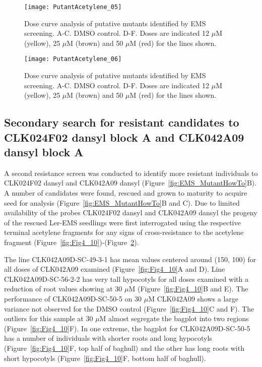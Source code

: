 \begin{figure}
\centering
\texttt{[image: PutantAcetylene\_05]}
\caption{Dose curve analysis of putative mutants identified by EMS screening. A-C. DMSO control. D-F. Doses are indicated 12 $\mu$M (yellow), 25 $\mu$M (brown) and 50 $\mu$M (red) for the lines shown.} 
\label{fig:Fig4_14}
\end{figure}

\begin{figure}
\centering
\texttt{[image: PutantAcetylene\_06]}
\caption{Dose curve analysis of putative mutants identified by EMS screening. A-C. DMSO control. D-F. Doses are indicated 12 $\mu$M (yellow), 25 $\mu$M (brown) and 50 $\mu$M (red) for the lines shown.} 
\label{fig:Fig4_15}
\end{figure}

\clearpage

\subsection{Secondary search for resistant candidates to CLK024F02 dansyl block A and CLK042A09 dansyl block A}


A second resistance screen was conducted to identify more resistant individuals to CLK024F02 dansyl and CLK042A09 dansyl (Figure~\ref{fig:EMS_MutantHowTo}B). A number of candidates were found, rescued and grown to maturity to acquire seed for analysis (Figure~\ref{fig:EMS_MutantHowTo}B and C). Due to limited availability of the probes CLK024F02 dansyl and CLK042A09 dansyl the progeny of the rescued Ler-EMS seedlings were first interrogated using the respective terminal acetylene fragments for any signs of cross-resistance to the acetylene fragment (Figure~\ref{fig:Fig4_10})-(Figure~\ref{fig:Fig4_15}). 

The line CLK042A09D-SC-49-3-1 has mean values centered around (150, 100) for all doses of CLK042A09 examined (Figure~\ref{fig:Fig4_10}A and D). Line CLK042A09D-SC-56-2-2 has very tall hypocotyls for all doses examined with a reduction of root values showing at 30 $\mu$M (Figure~\ref{fig:Fig4_10}B and E). The performance of CLK042A09D-SC-50-5 on 30 $\mu$M CLK042A09 shows a large variance not observed for the DMSO control (Figure~\ref{fig:Fig4_10}C and F). The outliers for this sample at 30 $\mu$M almost segregate the bagplot into two regions (Figure~\ref{fig:Fig4_10}F). In one extreme, the bagplot for CLK042A09D-SC-50-5 has a number of individuals with shorter roots and long hypocotyls (Figure~\ref{fig:Fig4_10}F, top half of baghull) and the other has long roots with short hypocotyls (Figure~\ref{fig:Fig4_10}F, bottom half of baghull). 

